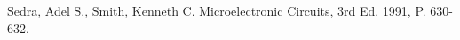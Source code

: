 \begin{thebibliography}{11}
		Sedra, Adel S., Smith, Kenneth C. Microelectronic Circuits, 3rd Ed. 1991, P. 630-632.
\end{thebibliography}